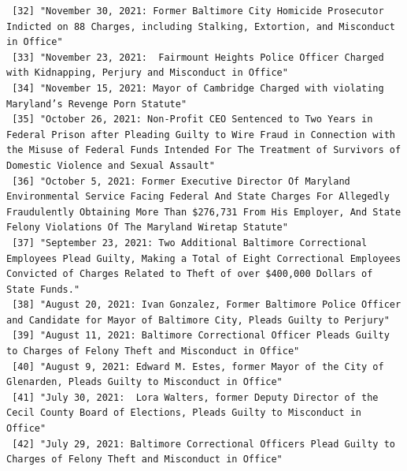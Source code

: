 \documentclass[
  letterpaper,
  DIV=11,
  numbers=noendperiod]{scrreprt}
\begin{document}
\begin{verbatim}
 [32] "November 30, 2021: Former Baltimore City Homicide Prosecutor Indicted on 88 Charges, including Stalking, Extortion, and Misconduct in Office"                                                                                                        
 [33] "November 23, 2021:  Fairmount Heights Police Officer Charged with Kidnapping, Perjury and Misconduct in Office"                                                                                                                                      
 [34] "November 15, 2021: Mayor of Cambridge Charged with violating Maryland’s Revenge Porn Statute"                                                                                                                                                        
 [35] "October 26, 2021: Non-Profit CEO Sentenced to Two Years in Federal Prison after Pleading Guilty to Wire Fraud in Connection with the Misuse of Federal Funds Intended For The Treatment of Survivors of Domestic Violence and Sexual Assault"        
 [36] "October 5, 2021: Former Executive Director Of Maryland Environmental Service Facing Federal And State Charges For Allegedly Fraudulently Obtaining More Than $276,731 From His Employer, And State Felony Violations Of The Maryland Wiretap Statute"
 [37] "September 23, 2021: Two Additional Baltimore Correctional Employees Plead Guilty, Making a Total of Eight Correctional Employees Convicted of Charges Related to Theft of over $400,000 Dollars of State Funds."                                     
 [38] "August 20, 2021: Ivan Gonzalez, Former Baltimore Police Officer and Candidate for Mayor of Baltimore City, Pleads Guilty to Perjury"                                                                                                                 
 [39] "August 11, 2021: Baltimore Correctional Officer Pleads Guilty to Charges of Felony Theft and Misconduct in Office"                                                                                                                                   
 [40] "August 9, 2021: Edward M. Estes, former Mayor of the City of Glenarden, Pleads Guilty to Misconduct in Office"                                                                                                                                       
 [41] "July 30, 2021:  Lora Walters, former Deputy Director of the Cecil County Board of Elections, Pleads Guilty to Misconduct in Office"                                                                                                                  
 [42] "July 29, 2021: Baltimore Correctional Officers Plead Guilty to Charges of Felony Theft and Misconduct in Office"                                                                                                                                     

\end{verbatim}
\end{document}
